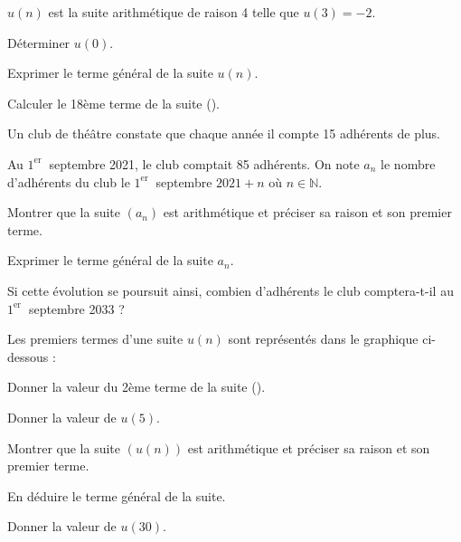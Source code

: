\documentclass[11pt,a4paper]{article}  %
\begin{document}
$u(n)$ est la suite arithmétique de raison 4 telle que $u(3)=-2$.
\begin{enumMet}
	\item Déterminer $u(0)$.
	\item Exprimer le terme général de la suite $u(n)$.
	\item Calculer le 18ème terme de la suite (\danger).
\end{enumMet}


Un club de théâtre constate que chaque année il compte 15 adhérents de plus.

Au $1^{\text {er }}$ septembre 2021, le club comptait 85 adhérents.
On note $a_n$ le nombre d'adhérents du club le $1^{\text {er }}$ septembre $2021+n$ où $n \in \mathbb{N}$.
\begin{enumMet}
	\item Montrer que la suite $\left(a_n\right)$ est arithmétique et préciser sa raison et son premier terme.
	\item Exprimer le terme général de la suite $a_n$.
	\item Si cette évolution se poursuit ainsi, combien d'adhérents le club comptera-t-il au $1^{\text {er }}$ septembre 2033 ?
\end{enumMet}


Les premiers termes d'une suite $u(n)$ sont représentés dans le graphique ci-dessous :

\begin{center}
\end{center}

\begin{enumMet}
	\item Donner la valeur du 2ème terme de la suite (\danger).
	\item Donner la valeur de $u(5)$.
	\item Montrer que la suite $\left(u(n)\right)$ est arithmétique et préciser sa raison et son premier terme.
	\item En déduire le terme général de la suite.
	\item {} Donner la valeur de $u(30)$.
\end{enumMet}
\end{document}
